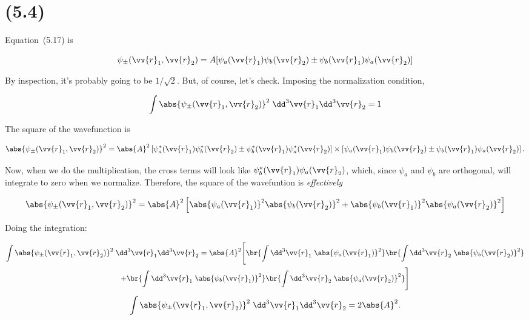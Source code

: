 \section{(5.4)}

\begin{parts}

  
\item Equation~(5.17) is

  \begin{equation}
    \psi_\pm(\vv{r}_1,\vv{r}_2) = A[\psi_a(\vv{r}_1) \psi_b(\vv{r}_2) \pm \psi_b(\vv{r}_1) \psi_a(\vv{r}_2)]
  \end{equation}

  By inspection, it's probably going to be $1/\sqrt{2}$. But, of course, let's check. Imposing the normalization condition,

  \begin{equation}
    \int \abs{\psi_\pm(\vv{r}_1,\vv{r}_2)}^2 \;\dd^3\vv{r}_1\dd^3\vv{r}_2 = 1
  \end{equation}

  The square of the wavefunction is

  \begin{equation}
    \abs{\psi_\pm(\vv{r}_1,\vv{r}_2)}^2 = \abs{A}^2 \left[ \psi_a^*(\vv{r}_1)\psi_b^*(\vv{r}_2) \pm \psi_b^*(\vv{r}_1)\psi_a^*(\vv{r}_2) \right] \times \left[ \psi_a(\vv{r}_1) \psi_b(\vv{r}_2) \pm \psi_b(\vv{r}_1) \psi_a(\vv{r}_2) \right].
  \end{equation}

  Now, when we do the multiplication, the cross terms will look like $\psi_b^*(\vv{r}_1)\psi_a(\vv{r}_2)$, which, since $\psi_a$ and $\psi_b$ are orthogonal, will integrate to zero when we normalize. Therefore, the square of the wavefuntion is \textit{effectively}

  \begin{equation}
    \abs{\psi_\pm(\vv{r}_1,\vv{r}_2)}^2 = \abs{A}^2 \left[ \abs{\psi_a(\vv{r}_1)}^2\abs{\psi_b(\vv{r}_2)}^2 + \abs{\psi_b(\vv{r}_1)}^2\abs{\psi_a(\vv{r}_2)}^2\right]
  \end{equation}

  Doing the integration:

  \begin{multline}
    \int \abs{\psi_\pm(\vv{r}_1,\vv{r}_2)}^2 \;\dd^3\vv{r}_1\dd^3\vv{r}_2 = \abs{A}^2\Bigg[\br{\int \dd^3\vv{r}_1 \;\abs{\psi_a(\vv{r}_1)}^2}\br{\int \dd^3\vv{r}_2 \;\abs{\psi_b(\vv{r}_2)}^2} \\ + \br{\int \dd^3\vv{r}_1 \;\abs{\psi_b(\vv{r}_1)}^2}\br{\int \dd^3\vv{r}_2 \;\abs{\psi_a(\vv{r}_2)}^2}\Bigg]
  \end{multline}
  \begin{equation}
    \int \abs{\psi_\pm(\vv{r}_1,\vv{r}_2)}^2 \;\dd^3\vv{r}_1\dd^3\vv{r}_2 = 2\abs{A}^2.
  \end{equation}


\end{parts}

